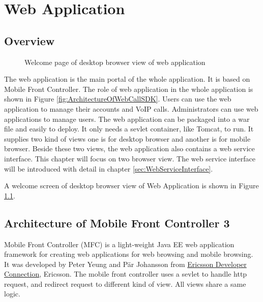 
\chapter{Web Application}
\label{sec:WebApplication}

\section{Overview}
\label{sec:WebApplication:Overview}

\begin{figure}[!hbtp]
\centering
{}
\caption{Welcome page of desktop browser view of web application}
\label{fig:WelcomePageOfDesktopBrowserView}
\end{figure}

The web application is the main portal of the whole application. It is based on Mobile Front Controller. The role of web application in the whole application is shown in Figure \ref{fig:ArchitectureOfWebCallSDK}. Users can use the web application to manage their accounts and VoIP calls. Administrators can use web applications to manage users. The web application can be packaged into a war file and easily to deploy. It only needs a sevlet container, like Tomcat, to run. It supplies two kind of views one is for desktop browser and another is for mobile browser. Beside these two views, the web application also contains a web service interface. This chapter will focus on two browser view. The web service interface will be introduced with detail in chapter \ref{sec:WebServiceInterface}.

A welcome screen of desktop browser view of Web Application is shown in Figure \ref{fig:WelcomePageOfDesktopBrowserView}.

\section{Architecture of Mobile Front Controller 3}
\label{sec:WebApplication:ArchitectureOfMobileFrontController3}

Mobile Front Controller\label{sym:MFC} (MFC) is a light-weight Java EE web application framework for creating web applications for web browsing and mobile browsing. It was developed by Peter Yeung and P\"{a}r Johansson from \href{http://www.ericsson.com/developer/}{Ericsson Developer Connection}, Ericsson\cite{MobileFrontController}. The mobile front controller uses a sevlet to handle http request, and redirect request to different kind of view. All views share a same logic. 

